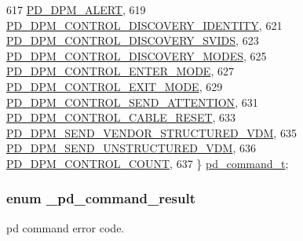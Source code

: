 \begin{DoxyCode}
617     \hyperlink{group__usb__pd__stack_ggabf2676c3360b7c572954ae09c0a5e46aa8c3275bb19f98d5824b531743b7777a8}{PD\_DPM\_ALERT},
619     \hyperlink{group__usb__pd__stack_ggabf2676c3360b7c572954ae09c0a5e46aa9db050ca92168863b9d0d02111a62d1f}{PD\_DPM\_CONTROL\_DISCOVERY\_IDENTITY},
621     \hyperlink{group__usb__pd__stack_ggabf2676c3360b7c572954ae09c0a5e46aaee8cd08286d5286bdf2284f9af10e3ad}{PD\_DPM\_CONTROL\_DISCOVERY\_SVIDS},
623     \hyperlink{group__usb__pd__stack_ggabf2676c3360b7c572954ae09c0a5e46aaf975cd0b8e1039525d282a872236eb96}{PD\_DPM\_CONTROL\_DISCOVERY\_MODES},
625     \hyperlink{group__usb__pd__stack_ggabf2676c3360b7c572954ae09c0a5e46aaa2c72dc0674fc14bc03afbf89da88e2b}{PD\_DPM\_CONTROL\_ENTER\_MODE},
627     \hyperlink{group__usb__pd__stack_ggabf2676c3360b7c572954ae09c0a5e46aa979f0d2508a56e60739866d338599f73}{PD\_DPM\_CONTROL\_EXIT\_MODE},
629     \hyperlink{group__usb__pd__stack_ggabf2676c3360b7c572954ae09c0a5e46aaa667bfb403fe6661d8f5719edd81a281}{PD\_DPM\_CONTROL\_SEND\_ATTENTION},
631     \hyperlink{group__usb__pd__stack_ggabf2676c3360b7c572954ae09c0a5e46aae13452ea340b015ac0aee25132562737}{PD\_DPM\_CONTROL\_CABLE\_RESET},
633     \hyperlink{group__usb__pd__stack_ggabf2676c3360b7c572954ae09c0a5e46aa436be299ae6338153908ef5b59d5f84e}{PD\_DPM\_SEND\_VENDOR\_STRUCTURED\_VDM},
635     \hyperlink{group__usb__pd__stack_ggabf2676c3360b7c572954ae09c0a5e46aaa91f5407fe2e9e626a11c16f151dced1}{PD\_DPM\_SEND\_UNSTRUCTURED\_VDM},
636     \hyperlink{group__usb__pd__stack_ggabf2676c3360b7c572954ae09c0a5e46aa5eca4c7abaa74e09ff6d747c4eb73c7c}{PD\_DPM\_CONTROL\_COUNT},
637 \} \hyperlink{group__usb__pd__stack_ga91457cf9522e345a0efa2e2a7424bb0d}{pd\_command\_t};
\end{DoxyCode}
\hypertarget{group__usb__pd__stack_gaa0c9fbfbfb4442ef9d805438bfeb045c}{
\subsubsection[{\-\_\-pd\-\_\-command\-\_\-result}]{\setlength{\rightskip}{0pt plus 5cm}enum {\bf \-\_\-pd\-\_\-command\-\_\-result}}}\label{group__usb__pd__stack_gaa0c9fbfbfb4442ef9d805438bfeb045c}


pd command error code. 

